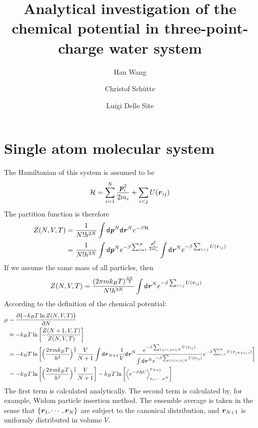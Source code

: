 \documentclass[aip,jcp,a4paper,reprint,onecolumn]{revtex4-1}
\newcommand{\vect}[1]{\textbf{\textit{#1}}}
\newcommand{\dd}[0]{\textsf{d}}
\newcommand{\mh}{\mathcal H}
\begin{document}
\title{Analytical investigation of the chemical potential in three-point-charge water system}
\author{Han Wang}
\author{Christof Sch\"utte}
\author{Luigi Delle Site}

\begin{abstract}
\end{abstract}

\maketitle

\section{Single atom molecular system}

The Hamiltonian of this system is assumed to be
\begin{align}
  \mh = \sum_{i=1}^N\frac{\vect p_i^2}{2m_i} + \sum_{i<j}U(\vect r_{ij})
\end{align}
The partition function is therefore
\begin{align}\nonumber
  Z(N,V,T)
  &=
  \frac{1}{N! h^{3N}} \int\dd\vect p^{N}\dd\vect r^N e^{-\beta\mh}\\\nonumber
  &=
  \frac{1}{N! h^{3N}} \int\dd\vect p^{N} e^{-\beta \sum_{i=1}^N\frac{\vect p_i^2}{2m_i}}
  \int\dd\vect r^Ne^{ -\beta\sum_{i<j} U(\vect r_{ij})}
\end{align}
If we assume the same mass of all particles, then
\begin{align}
  Z(N,V,T)
  &=
  \frac{(2\pi mk_BT)^{\frac{3N}2}}{N! h^{3N}}
  \int\dd\vect r^Ne^{ -\beta\sum_{i<j} U(\vect r_{ij})}
\end{align}
According to the definition of the chemical potential:
\begin{align}\nonumber
  \mu &= \frac{\partial \{-k_BT\ln Z(N,V,T)\}}{\partial N} \\\nonumber
  &\approx
  -k_BT \ln
  \bigg[
  \frac{Z(N+1,V,T)}{Z(N,V,T)}
  \bigg] \\ \nonumber
  & =
  -k_BT \ln
  \bigg[
  \Big(
  \frac{2\pi mk_BT}{h^2}
  \Big)^{\frac32}
  \frac{V}{N+1}
  \int\dd\vect r_{N+1} \frac 1V
  \dd\vect r^N
  \frac{e^{ -\beta\sum_{1\leq i<j=\leq N} U(\vect r_{ij})}}
  {\int\dd\vect r^Ne^{ -\beta\sum_{1\leq i<j\leq N} U(\vect r_{ij})}}
  e^{-\beta \sum_{i=1}^N U(\vect r_{(N+1),i})}
  \bigg]\\
  &=
  -k_BT \ln
  \bigg[
  \Big(
  \frac{2\pi mk_BT}{h^2}
  \Big)^{\frac32}
  \frac{V}{N+1}
  \bigg]
  -k_BT \ln
  \bigg[
  \Big\langle
  e^{-\beta\Delta U}
  \Big\rangle_{\vect r_1,\cdots,\vect r^N}^{\vect r_{N+1}}
  \bigg]
\end{align}
The first term is calculated analytically. The second term is calculated by, for example,
Widom particle insertion method. The ensemble average is taken in the sense that
$\{\vect r_1, \cdots, \vect r_N\}$ are subject to the canonical distribution,
and $\vect r_{N+1}$ is uniformly distributed in volume $V$.
\end{document}
